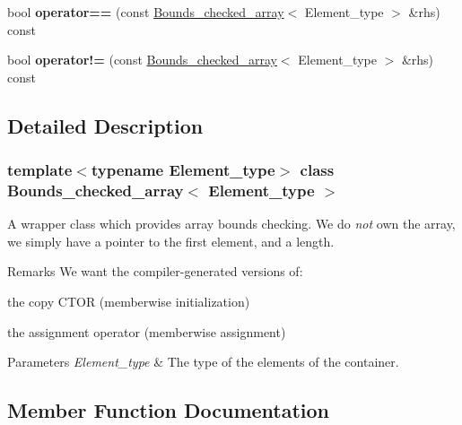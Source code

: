 \begin{DoxyCompactItemize}
\mbox{\label{classBounds__checked__array_af5be5e0ba76f9fd480bc11ff463e70a6}} 
bool {\bfseries operator==} (const \mbox{\hyperlink{classBounds__checked__array}{Bounds\+\_\+checked\+\_\+array}}$<$ Element\+\_\+type $>$ \&rhs) const
\item 
\mbox{\label{classBounds__checked__array_a353d27e288d95fc2849b187a4ff85f52}} 
bool {\bfseries operator!=} (const \mbox{\hyperlink{classBounds__checked__array}{Bounds\+\_\+checked\+\_\+array}}$<$ Element\+\_\+type $>$ \&rhs) const
\end{DoxyCompactItemize}


\subsection{Detailed Description}
\subsubsection*{template$<$typename Element\+\_\+type$>$\newline
class Bounds\+\_\+checked\+\_\+array$<$ Element\+\_\+type $>$}

A wrapper class which provides array bounds checking. We do {\itshape not} own the array, we simply have a pointer to the first element, and a length.

\begin{DoxyRemark}{Remarks}
We want the compiler-\/generated versions of\+:
\begin{DoxyItemize}
\item the copy C\+T\+OR (memberwise initialization)
\item the assignment operator (memberwise assignment)
\end{DoxyItemize}
\end{DoxyRemark}

\begin{DoxyParams}{Parameters}
{\em Element\+\_\+type} & The type of the elements of the container. \\
\hline
\end{DoxyParams}


\subsection{Member Function Documentation}
\mbox{\label{classBounds__checked__array_a53fc15030e185de8272bfe0dc130ae11}} 
